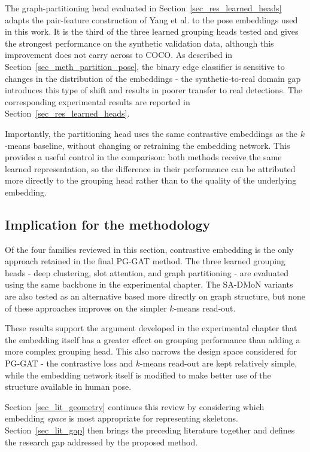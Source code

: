 The graph-partitioning head evaluated in Section~\ref{sec_res_learned_heads}
adapts the pair-feature construction of Yang et al. to the pose embeddings used in this work.
It is the third of the three learned grouping heads tested
and gives the strongest performance on the synthetic validation data,
although this improvement does not carry across to COCO.
As described in Section~\ref{sec_meth_partition_pose},
the binary edge classifier is sensitive to changes in the distribution of the embeddings -
the synthetic-to-real domain gap introduces this type of shift and results in poorer transfer to real detections.
The corresponding experimental results are reported in Section~\ref{sec_res_learned_heads}.

Importantly, the partitioning head uses the same contrastive embeddings as the $k$-means baseline,
without changing or retraining the embedding network.
This provides a useful control in the comparison:
both methods receive the same learned representation,
so the difference in their performance can be attributed more directly to the grouping head
rather than to the quality of the underlying embedding.


\subsection{Implication for the methodology}
\label{sec_lit_rep_learn_implication}

Of the four families reviewed in this section,
contrastive embedding is the only approach retained in the final PG-GAT method.
The three learned grouping heads - deep clustering, slot attention, and graph partitioning -
are evaluated using the same backbone in the experimental chapter.
The SA-DMoN variants are also tested as an alternative based more directly on graph structure,
but none of these approaches improves on the simpler $k$-means read-out.

These results support the argument developed in the experimental chapter
that the embedding itself has a greater effect on grouping performance than adding a more complex grouping head.
This also narrows the design space considered for PG-GAT -
the contrastive loss and $k$-means read-out are kept relatively simple,
while the embedding network itself is modified to make better use of the structure available in human pose.

Section~\ref{sec_lit_geometry} continues this review
by considering which embedding \emph{space} is most appropriate for representing skeletons.
Section~\ref{sec_lit_gap} then brings the preceding literature together
and defines the research gap addressed by the proposed method.